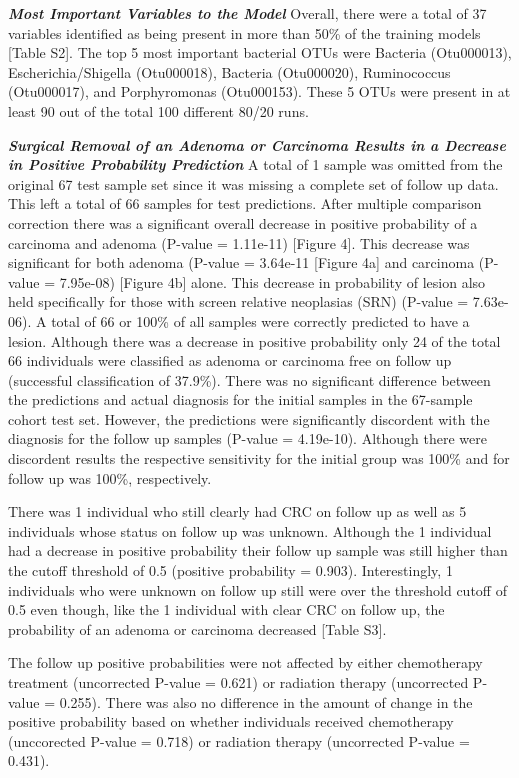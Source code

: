 \documentclass[12pt,]{article}
\begin{document}
\textbf{\emph{Most Important Variables to the Model}} Overall, there
were a total of 37 variables identified as being present in more than
50\% of the training models {[}Table S2{]}. The top 5 most important
bacterial OTUs were Bacteria (Otu000013), Escherichia/Shigella
(Otu000018), Bacteria (Otu000020), Ruminococcus (Otu000017), and
Porphyromonas (Otu000153). These 5 OTUs were present in at least 90 out
of the total 100 different 80/20 runs.

\textbf{\emph{Surgical Removal of an Adenoma or Carcinoma Results in a
Decrease in Positive Probability Prediction}} A total of 1 sample was
omitted from the original 67 test sample set since it was missing a
complete set of follow up data. This left a total of 66 samples for test
predictions. After multiple comparison correction there was a
significant overall decrease in positive probability of a carcinoma and
adenoma (P-value = 1.11e-11) {[}Figure 4{]}. This decrease was
significant for both adenoma (P-value = 3.64e-11 {[}Figure 4a{]} and
carcinoma (P-value = 7.95e-08) {[}Figure 4b{]} alone. This decrease in
probability of lesion also held specifically for those with screen
relative neoplasias (SRN) (P-value = 7.63e-06). A total of 66 or 100\%
of all samples were correctly predicted to have a lesion. Although there
was a decrease in positive probability only 24 of the total 66
individuals were classified as adenoma or carcinoma free on follow up
(successful classification of 37.9\%). There was no significant
difference between the predictions and actual diagnosis for the initial
samples in the 67-sample cohort test set. However, the predictions were
significantly discordent with the diagnosis for the follow up samples
(P-value = 4.19e-10). Although there were discordent results the
respective sensitivity for the initial group was 100\% and for follow up
was 100\%, respectively.

There was 1 individual who still clearly had CRC on follow up as well as
5 individuals whose status on follow up was unknown. Although the 1
individual had a decrease in positive probability their follow up sample
was still higher than the cutoff threshold of 0.5 (positive probability
= 0.903). Interestingly, 1 individuals who were unknown on follow up
still were over the threshold cutoff of 0.5 even though, like the 1
individual with clear CRC on follow up, the probability of an adenoma or
carcinoma decreased {[}Table S3{]}.

The follow up positive probabilities were not affected by either
chemotherapy treatment (uncorrected P-value = 0.621) or radiation
therapy (uncorrected P-value = 0.255). There was also no difference in
the amount of change in the positive probability based on whether
individuals received chemotherapy (unccorected P-value = 0.718) or
radiation therapy (uncorrected P-value = 0.431).
\end{document}
